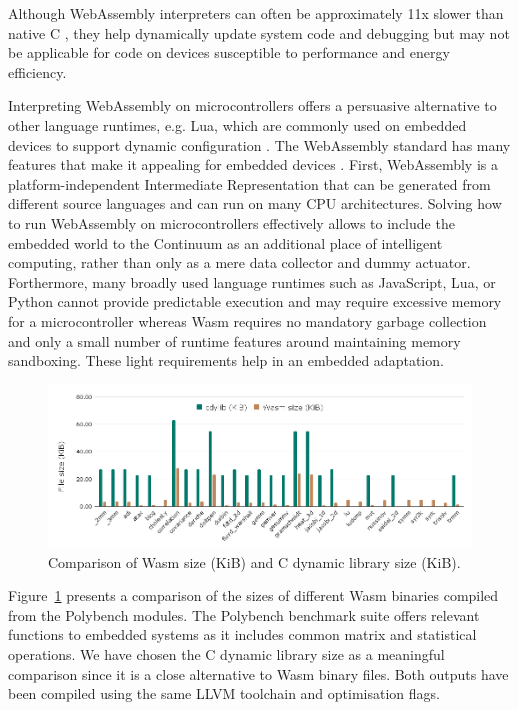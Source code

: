 Although WebAssembly interpreters can often be approximately 11x slower than native C \cite{wasm3-performance}, they help dynamically update system code and debugging but may not be applicable for code on devices susceptible to performance and energy efficiency.

Interpreting WebAssembly on microcontrollers offers a persuasive alternative to other language runtimes, e.g. Lua, which are commonly used on embedded devices to support dynamic configuration \cite{brzoza2016embedded}. The WebAssembly standard has many features that make it appealing for embedded devices \cite{peach2020ewasm}. First, WebAssembly is a platform-independent Intermediate Representation that can be generated from different source languages and can run on many CPU architectures. Solving how to run WebAssembly on microcontrollers effectively allows to include the embedded world to the Continuum as an additional place of intelligent computing, rather than only as a mere data collector and dummy actuator. Forthermore, many broadly used language runtimes such as JavaScript, Lua, or Python cannot provide predictable execution and may require excessive memory for a microcontroller whereas Wasm requires no mandatory garbage collection and only a small number of runtime features around maintaining memory sandboxing. These light requirements help in an embedded adaptation.

\begin{figure}[ht]
\centering
\includegraphics[width=\columnwidth]{figures/b-wasmi-3}
\caption{Comparison of Wasm size (KiB) and C dynamic library size (KiB).} \label{fig:b-wasmi-3}
\end{figure}

Figure~\ref{fig:b-wasmi-3} presents a comparison of the sizes of different Wasm binaries compiled from the Polybench \cite{yuki2014understanding} modules. The Polybench benchmark suite offers relevant functions to embedded systems as it includes common matrix and statistical operations. We have chosen the C dynamic library size as a meaningful comparison since it is a close alternative to Wasm binary files. Both outputs have been compiled using the same LLVM toolchain and optimisation flags.

